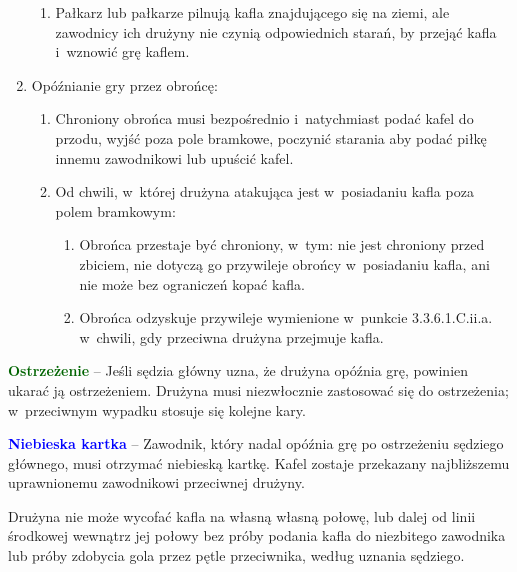 \documentclass[12pt,a4paper]{article}
\renewcommand{\paragraph}[1]{
  \oldparagraph{#1}%
  \leftskip2.8cm
}
\newcommand\bluecard[1]{\bgroup\textcolor{blue}{\textbf{#1}}}
\newcommand\other[1]{\bgroup\textcolor{darkgreen}{\textbf{#1}}}
\begin{document}
\begin{enumerate}
\begin{enumerate}
		      \item Pałkarz lub pałkarze pilnują kafla znajdującego się na ziemi, ale
		            zawodnicy ich drużyny nie czynią odpowiednich starań, by przejąć kafla i~wznowić grę kaflem.
	      \end{enumerate}

	\item Opóźnianie gry przez obrońcę:
	      \begin{enumerate}
		      \item Chroniony obrońca musi bezpośrednio i~natychmiast podać
		            kafel do przodu, wyjść poza pole bramkowe, poczynić starania aby
		            podać piłkę innemu zawodnikowi lub upuścić kafel.

		      \item Od chwili, w~której drużyna atakująca jest w~posiadaniu kafla poza
		            polem bramkowym:
		            \begin{enumerate}
			            \item Obrońca przestaje być chroniony, w~tym: nie jest chroniony przed
			                  zbiciem, nie dotyczą go przywileje obrońcy w~posiadaniu kafla, ani nie
			                  może bez ograniczeń kopać kafla.

			            \item Obrońca odzyskuje przywileje wymienione w~punkcie 3.3.6.1.C.ii.a.
			                  w~chwili, gdy przeciwna drużyna przejmuje kafla.
		            \end{enumerate}
	      \end{enumerate}
\end{enumerate}

\other{Ostrzeżenie} -- Jeśli sędzia główny uzna, że drużyna
opóźnia grę, powinien ukarać ją ostrzeżeniem. Drużyna musi
niezwłocznie zastosować się do ostrzeżenia; w~przeciwnym wypadku stosuje
się kolejne kary.

\bluecard{Niebieska kartka} -- Zawodnik, który nadal opóźnia grę po
ostrzeżeniu sędziego głównego, musi otrzymać niebieską kartkę. Kafel
zostaje przekazany najbliższemu uprawnionemu zawodnikowi przeciwnej
drużyny.

\paragraph{Wycofanie}
Drużyna nie może wycofać kafla na własną
własną połowę, lub dalej od linii środkowej wewnątrz jej połowy bez
próby podania kafla do niezbitego zawodnika lub próby zdobycia
gola przez pętle przeciwnika, według uznania sędziego.
\end{document}
